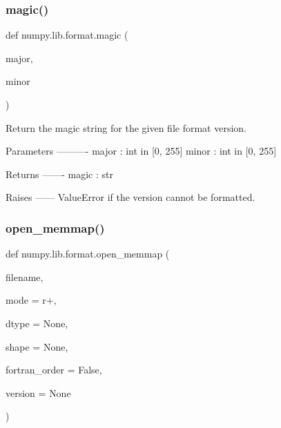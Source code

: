 \subsubsection{\texorpdfstring{magic()}{magic()}}
{\footnotesize\ttfamily def numpy.\+lib.\+format.\+magic (\begin{DoxyParamCaption}\item[{}]{major,  }\item[{}]{minor }\end{DoxyParamCaption})}

\begin{DoxyVerb}Return the magic string for the given file format version.

Parameters
----------
major : int in [0, 255]
minor : int in [0, 255]

Returns
-------
magic : str

Raises
------
ValueError if the version cannot be formatted.
\end{DoxyVerb}
 \mbox{\label{namespacenumpy_1_1lib_1_1format_a8f8b17821ffe903261f3b58cabd8f386}} 
\subsubsection{\texorpdfstring{open\+\_\+memmap()}{open\_memmap()}}
{\footnotesize\ttfamily def numpy.\+lib.\+format.\+open\+\_\+memmap (\begin{DoxyParamCaption}\item[{}]{filename,  }\item[{}]{mode = {\ttfamily \textquotesingle{}r+\textquotesingle{}},  }\item[{}]{dtype = {\ttfamily None},  }\item[{}]{shape = {\ttfamily None},  }\item[{}]{fortran\+\_\+order = {\ttfamily False},  }\item[{}]{version = {\ttfamily None} }\end{DoxyParamCaption})}

